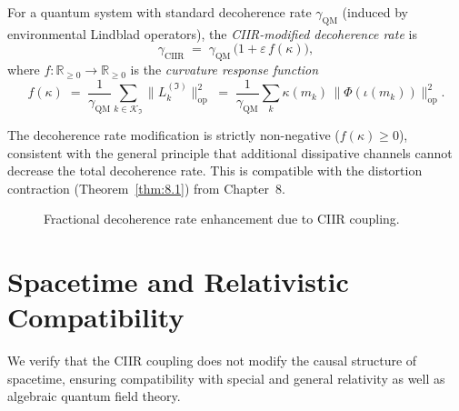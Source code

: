 \begin{definition}
\label{def:10.12}
For a quantum system with standard decoherence rate
$\gamma_{\mathrm{QM}}$ (induced by environmental Lindblad operators),
the \emph{CIIR-modified decoherence rate} is
\begin{equation}
\label{eq:10.decoherence}
  \gamma_{\mathrm{CIIR}}
  \;=\;
  \gamma_{\mathrm{QM}}\,
  \bigl(1 + \varepsilon\,f(\kappa)\bigr),
\end{equation}
where $f:\mathbb{R}_{\geq 0}\to\mathbb{R}_{\geq 0}$ is the
\emph{curvature response function}
\[
  f(\kappa)
  \;=\;
  \frac{1}{\gamma_{\mathrm{QM}}}
  \sum_{k\in\mathcal{K}_{\mathfrak{I}}}
  \bigl\|L_k^{(\mathfrak{I})}\bigr\|_{\mathrm{op}}^2
  \;=\;
  \frac{1}{\gamma_{\mathrm{QM}}}
  \sum_k \kappa(m_k)\,\bigl\|\Phi(\iota(m_k))\bigr\|_{\mathrm{op}}^2.
\]
\end{definition}

\begin{remark}
\label{rem:10.3}
The decoherence rate modification is strictly non-negative
($f(\kappa)\geq 0$), consistent with the general principle that
additional dissipative channels cannot decrease the total decoherence
rate.  This is compatible with the distortion contraction
(Theorem~\ref{thm:8.1}) from Chapter~8.
\end{remark}

\begin{figure}[t]
\centering
{}
\caption{Fractional decoherence rate enhancement due to CIIR coupling.}
\label{fig:c10:decoherence}
\end{figure}

\section{Spacetime and Relativistic Compatibility}
\label{sec:ch10:relativistic}

We verify that the CIIR coupling does not modify the causal structure
of spacetime, ensuring compatibility with special and general
relativity as well as algebraic quantum field theory.

